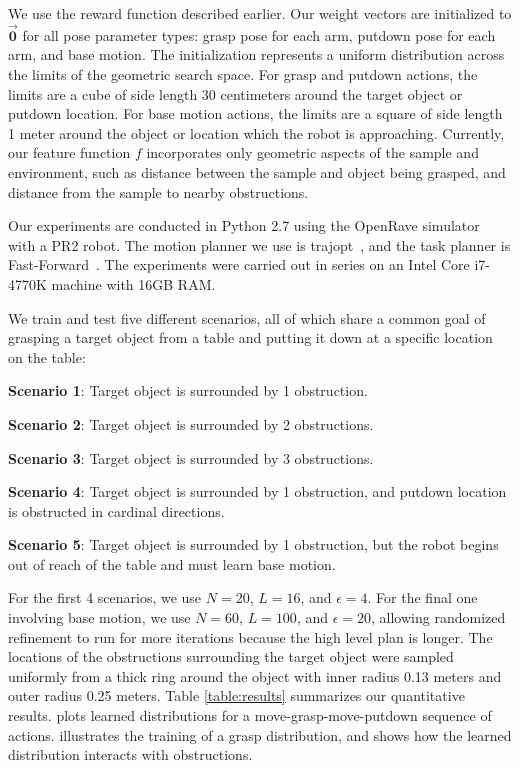 We use the reward function described earlier. Our weight
vectors are initialized to $\vec{\mathbf{0}}$ for all pose parameter types: grasp pose
for each arm, putdown pose for each arm, and base motion.
The initialization represents a uniform distribution across the limits of the geometric search space.
For grasp and putdown actions, the limits are a cube of side length 30 centimeters
around the target object or putdown location. For base motion actions, the limits are a
square of side length 1 meter around the object or location which the robot is approaching.
Currently, our feature function $f$ incorporates only geometric aspects of the sample and environment,
such as distance between the sample and object being grasped, and distance from the sample to
nearby obstructions.

Our experiments are conducted in Python 2.7 using the OpenRave simulator~\cite{Diankov_2008_6117} with a PR2 robot.
The motion planner we use is trajopt~\cite{schulman2013finding}, and the task planner is Fast-Forward~\cite{FF}.
The experiments were carried out in series on an Intel Core i7-4770K machine
with 16GB RAM.

We train and test five different scenarios, all of which share a common goal of
grasping a target object from a table and putting it down at a specific location on the table:
\begin{tightlist}
\item[\textbf{Scenario 1}:] Target object is surrounded by 1 obstruction.
\item[\textbf{Scenario 2}:] Target object is surrounded by 2 obstructions.
\item[\textbf{Scenario 3}:] Target object is surrounded by 3 obstructions.
\item[\textbf{Scenario 4}:] Target object is surrounded by 1 obstruction,
and putdown location is obstructed in cardinal directions.
\item[\textbf{Scenario 5}:] Target object is surrounded by 1 obstruction,
but the robot begins out of reach of the table and must learn base motion.
\end{tightlist}

For the first 4 scenarios, we use $N = 20$, $L = 16$, and $\epsilon = 4$.
For the final one involving base motion, we use $N = 60$, $L = 100$, and $\epsilon = 20$,
allowing randomized refinement to run for more iterations because the high level plan
is longer. The locations of the obstructions surrounding the target object were
sampled uniformly from a thick ring around the object with inner radius 0.13 meters
and outer radius 0.25 meters. Table \ref{table:results} summarizes our quantitative results.
 plots learned distributions for a move-grasp-move-putdown sequence of actions.
 illustrates the training of a grasp distribution, and 
shows how the learned distribution interacts with obstructions.

